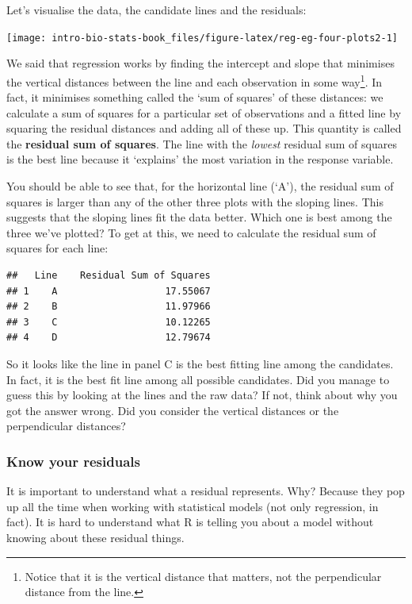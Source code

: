 \documentclass[
]{book}
\newenvironment{greybox}{
  \definecolor{shadecolor}{rgb}{0.95,0.95,0.95}  %
  \color{black}
  \begin{shaded}}
 {\end{shaded}}
\newenvironment{infobox}[1]
  {
  \begin{itemize}
  \renewcommand{\labelitemi}{
    \raisebox{-.7\height}[0pt][0pt]{
      {\setkeys{Gin}{width=3em,keepaspectratio}
        \texttt{[image: images/\#1]}}
    }
  }
  \setlength{\fboxsep}{1em}
  \begin{greybox}
  \item
  }
  {
  \end{greybox}
  \end{itemize}
  }
\begin{document}
Let's visualise the data, the candidate lines and the residuals:

\begin{center}\texttt{[image: intro-bio-stats-book\_files/figure-latex/reg-eg-four-plots2-1]} \end{center}

We said that regression works by finding the intercept and slope that minimises the vertical distances between the line and each observation in some way\footnote{Notice that it is the vertical distance that matters, not the perpendicular distance from the line.}. In fact, it minimises something called the `sum of squares' of these distances: we calculate a sum of squares for a particular set of observations and a fitted line by squaring the residual distances and adding all of these up. This quantity is called the \textbf{residual sum of squares}. The line with the \emph{lowest} residual sum of squares is the best line because it `explains' the most variation in the response variable.

You should be able to see that, for the horizontal line (`A'), the residual sum of squares is larger than any of the other three plots with the sloping lines. This suggests that the sloping lines fit the data better. Which one is best among the three we've plotted? To get at this, we need to calculate the residual sum of squares for each line:

\begin{verbatim}
##   Line    Residual Sum of Squares
## 1    A                   17.55067
## 2    B                   11.97966
## 3    C                   10.12265
## 4    D                   12.79674
\end{verbatim}

So it looks like the line in panel C is the best fitting line among the candidates. In fact, it is the best fit line among all possible candidates. Did you manage to guess this by looking at the lines and the raw data? If not, think about why you got the answer wrong. Did you consider the vertical distances or the perpendicular distances?

\begin{infobox}{warning}

\hypertarget{know-your-residuals}{%
\subsubsection*{Know your residuals}\label{know-your-residuals}}

It is important to understand what a residual represents. Why? Because they pop up all the time when working with statistical models (not only regression, in fact). It is hard to understand what R is telling you about a model without knowing about these residual things.

\end{infobox}
\end{document}

